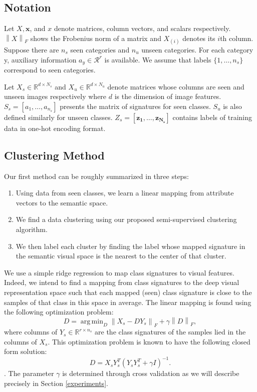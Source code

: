 \documentclass[10pt,twocolumn,letterpaper]{article}
\newcommand{\norm}[1]{\left \lVert #1 \right \rVert_{F}}
\DeclareMathOperator*{\argmin}{arg\,min}
\begin{document}
\subsection{Notation}
Let $X, \mathbf{x}$, and $x$ denote matrices, column vectors, and scalars respectively. $\norm{X}$ shows the Frobenius norm of a matrix and
$X_{(i)}$ denotes its $i$th column.
Suppose there are $n_s$ seen categories and $n_u$ unseen categories. For each category y,
auxiliary information $a_y \in \mathcal{R}^r$ is available. We assume that labels $\{1, \ldots, n_s \}$ correspond to seen categories.

Let $X_s \in \mathbb{R}^{d \times N_s}$ and $X_u \in \mathbb{R}^{d \times N_u}$
denote matrices whose columns are seen and unseen images respectively where $d$ is the dimension of image features.
$S_s = [a_1, \ldots, a_{n_s}]$ presents the matrix of signatures for seen classes. $S_u$ is also defined similarly for unseen classes.
$Z_s = [ \mathbf{z_1}, \ldots, \mathbf{z_{N_s}} ]$
contains labels of training data in one-hot encoding format.

\subsection{Clustering Method} \label{clustering}
Our first method can be roughly summarized in three steps:
\begin{enumerate}
  \item Using data from seen classes, we learn a linear mapping from attribute vectors to the semantic space.
  \item We find a data clustering using our proposed semi-supervised clustering algorithm.
  \item We then label each cluster by finding the label whose mapped signature in the semantic visual space is the nearest to the center of that cluster.
\end{enumerate}
 
We use a simple ridge regression to map class signatures to visual features. Indeed, we intend to find a mapping from class signatures to the deep visual representation space such that each mapped (seen) class signature is close to the samples of that class in this space in average. 
The linear mapping is found using the following optimization problem:
\begin{equation} \label{eq:mapping}
  D = \argmin_D \norm{X_s - D Y_s} + \gamma \norm{D},
\end{equation}
where columns of $ Y_s \in \mathbb{R}^{r \times n_s} $ are the class signatures of the samples lied in the columns of $X_s$.
This optimization problem is known to have the following closed form solution:
\begin{equation} \label{eq:dic}
  D = X_s Y_s^T (Y_s Y_s^T + \gamma I)^{-1}.
\end{equation}.
The parameter $\gamma$ is determined through cross validation as we will describe precisely in Section \ref{experiments}.
\end{document}
